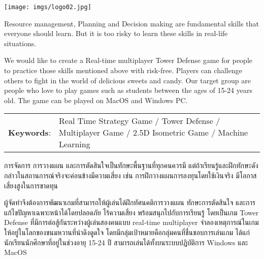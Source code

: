 \documentclass[12pt,oneside,openright,a4paper]{cpe-thai-project}
\begin{document}
\pdfstringdefDisableCommands{%
\let\MakeUppercase\relax
}

\begin{center}
  \texttt{[image: imgs/logo02.jpg]}
\end{center}
\vspace*{-1cm}

\maketitlepage
\makesignaturepage 


\abstract

Resource management, Planning and Decision making are fundamental skills 
that everyone should learn. But it is too risky to learn these skills in real-life situations.

We would like to create a Real-time multiplayer Tower Defense game for people to practice 
those skills mentioned above with risk-free. Players can challenge others to fight in the 
world of delicious sweets and candy. Our target group are people who love to play games such as 
students between the ages of 15-24 years old. The game can be played on MacOS and Windows PC.

\begin{flushleft}
\begin{tabular*}{\textwidth}{@{}lp{}}
\textbf{Keywords}: & Real Time Strategy Game / Tower Defense / Multiplayer Game / 2.5D Isometric Game / Machine Learning
\end{tabular*}
\end{flushleft}
\endabstract


\thaiabstract

การจัดการ การวางแผน และการตัดสินใจเป็นทักษะพื้นฐานที่ทุกคนควรมี 
แต่ถ้าเรียนรู้และฝึกทักษะดังกล่าวในสถานการณ์จริงจะค่อนข้างมีความเสี่ยง เช่น การฝึกวางแผนการลงทุนโดยใช้เงินจริง 
มีโอกาสเสี่ยงสูงในการขาดทุน 

ผู้จัดทำจึงต้องการพัฒนาเกมที่สามารถให้ผู้เล่นได้ฝึกทัศนคติการวางแผน 
ทักษะการตัดสินใจ และการแก้ไขปัญหาเฉพาะหน้าได้โดยปลอดภัย ไร้ความเสี่ยง 
พร้อมสนุกไปกับการเรียนรู้ โดยเป็นเกม Tower Defense ที่มีการต่อสู้กันระหว่างผู้เล่นสองคนแบบ 
real-time multiplayer จำลองเหตุการณ์ในเกมให้อยู่ในโลกของขนมหวานที่น่าดึงดูดใจ 
โดยมีกลุ่มเป้าหมายคือกลุ่มคนที่ชื่นชอบการเล่นเกม ได้แก่ นักเรียนนักศึกษาที่อยู่ในช่วงอายุ 15-24 ปี 
สามารถเล่นได้ทั้งบนระบบปฏิบัติการ Windows และ MacOS
\end{document}
